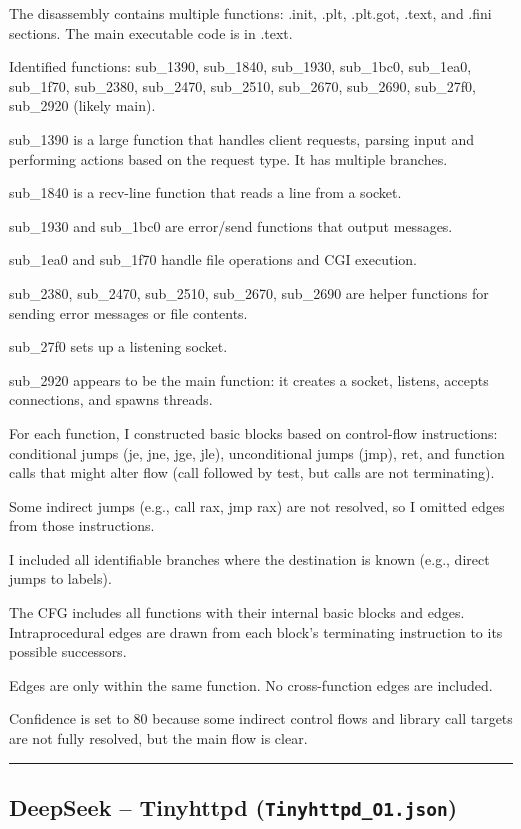 The disassembly contains multiple functions: .init, .plt, .plt.got, .text, and .fini sections. The main executable code is in .text.

Identified functions: sub\_1390, sub\_1840, sub\_1930, sub\_1bc0, sub\_1ea0, sub\_1f70, sub\_2380, sub\_2470, sub\_2510, sub\_2670, sub\_2690, sub\_27f0, sub\_2920 (likely main).

sub\_1390 is a large function that handles client requests, parsing input and performing actions based on the request type. It has multiple branches.

sub\_1840 is a recv-line function that reads a line from a socket.

sub\_1930 and sub\_1bc0 are error/send functions that output messages.

sub\_1ea0 and sub\_1f70 handle file operations and CGI execution.

sub\_2380, sub\_2470, sub\_2510, sub\_2670, sub\_2690 are helper functions for sending error messages or file contents.

sub\_27f0 sets up a listening socket.

sub\_2920 appears to be the main function: it creates a socket, listens, accepts connections, and spawns threads.

For each function, I constructed basic blocks based on control-flow instructions: conditional jumps (je, jne, jge, jle), unconditional jumps (jmp), ret, and function calls that might alter flow (call followed by test, but calls are not terminating).

Some indirect jumps (e.g., call rax, jmp rax) are not resolved, so I omitted edges from those instructions.

I included all identifiable branches where the destination is known (e.g., direct jumps to labels).

The CFG includes all functions with their internal basic blocks and edges. Intraprocedural edges are drawn from each block's terminating instruction to its possible successors.

Edges are only within the same function. No cross-function edges are included.

Confidence is set to 80 because some indirect control flows and library call targets are not fully resolved, but the main flow is clear.

\bigskip
\hrule
\bigskip

\subsection{DeepSeek -- Tinyhttpd (\texttt{Tinyhttpd\_O1.json})}


